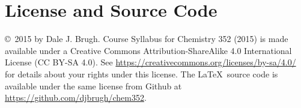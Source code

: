 \documentclass[letterpaper,oneside,onecolumn,11pt,article]{memoir}
\begin{document}
\section{License and Source Code}
\copyright\ 2015 by Dale J. Brugh. Course Syllabus for Chemistry 352 (2015) is made available under a Creative Commons Attribution-ShareAlike 4.0 International License (CC BY-SA 4.0). See \href{https://creativecommons.org/licenses/by-sa/4.0/}{https://creativecommons.org/licenses/by-sa/4.0/} for details about your rights under this license. The \LaTeX\ source code is available under the same license from Github at \href{https://github.com/djbrugh/chem352}{https://github.com/djbrugh/chem352}. 
\end{document}

